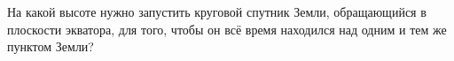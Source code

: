 На какой высоте нужно запустить круговой спутник Земли,
обращающийся в плоскости экватора,
для того, чтобы он всё время находился над одним и тем же пунктом Земли?
